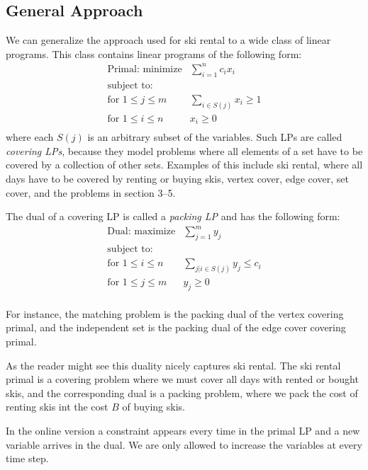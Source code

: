 \subsection{General Approach}
\label{section:general_approach}
We can generalize the approach used for ski rental to a wide class of linear programs.
This class contains linear programs of the following form:
\[
	\begin{array}{lr}
	\textrm{Primal: minimize}   & \sum_{i=1}^n c_i x_i   \\
	\textrm{subject to:} & \\
	\textrm{for $1 \le j \le m$} & \sum_{i \in S(j)} x_i  \ge 1  \\
	\textrm{for $1 \le i \le n$} & x_i  \ge 0  \\
	\end{array}
\]
where each $S(j)$ is an arbitrary subset of the variables.
Such LPs are called \emph{covering LPs}, because they model problems where all elements of a set have to be covered by a collection of other sets.
Examples of this include ski rental, where all days have to be covered by renting or buying skis, vertex cover, edge cover, set cover, and the problems in section 3--5.

The dual of a covering LP is called a \emph{packing LP} and has the following form:
\[
	\begin{array}{lr}
	\textrm{Dual: maximize}   & \sum_{j=1}^m y_j   \\
	\textrm{subject to:} & \\
	\textrm{for $1 \le i \le n$} & \sum_{j | i \in S(j)} y_j  \le c_i  \\
	\textrm{for $1 \le j \le m$} & y_j \ge 0  \\
	\end{array}
\]

For instance, the matching problem is the packing dual of the vertex covering primal, and the independent set is the packing dual of the edge cover covering primal.

As the reader might see this duality nicely captures ski rental.
The ski rental primal is a covering problem where we must cover all days with rented or bought skis, and the corresponding dual is a packing problem, where we pack the cost of renting skis int the cost $B$ of buying skis.

In the online version a constraint appears every time in the primal LP and a new variable arrives in the dual. We are only allowed to increase the variables at every time step.


